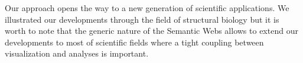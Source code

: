 \documentclass{vgtc}                          %
\begin{document}
Our approach opens the way to a new generation of scientific applications. We illustrated our developments through the field of structural biology but it is worth to note that the generic nature of the Semantic Webs allows to extend our developments to most of scientific fields where a tight coupling between visualization and analyses is important. 











\end{document}

